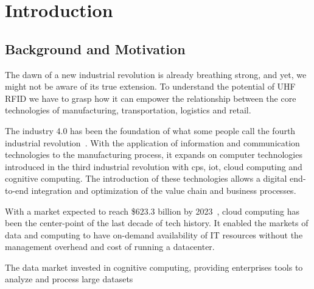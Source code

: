 
\chapter{Introduction}

\section{Background and Motivation}

The dawn of a new industrial revolution is already breathing strong, and yet, we might not be aware of its true extension. 
To understand the potential of \gls{UHF RFID} we have to grasp how it can empower the relationship between the core technologies of manufacturing, transportation, logistics and retail.

The \gls{industry 4.0} has been the foundation of what some people call the fourth industrial revolution~\cite{marrWhatIndustryHere}. 
With the application of information and communication technologies to the manufacturing process, it expands on computer technologies introduced in the third industrial revolution with \gls{cps}, \gls{iot}, \gls{cloud computing} and \gls{cognitive computing}.
The introduction of these technologies allows a digital end-to-end integration and optimization of the \gls{value chain} and \gls{business processes}.

With a market expected to reach \$$623.3$ billion by 2023~\cite{CloudComputingMarket}, \gls{cloud computing} has been the center-point of the last decade of tech history. It enabled the markets of data and computing to have on-demand availability of \gls{IT} resources without the management overhead and cost of running a datacenter. 

The data market invested in \gls{cognitive computing}, providing enterprises tools to analyze and process large datasets


